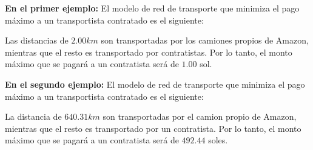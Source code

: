 \exampleCases

\begin{example}
\end{example}

\explanationText


\textbf{En el primer ejemplo:} El modelo de red de transporte que minimiza el pago máximo a un transportista contratado es el siguiente:

\begin{figure}[h]
    \centering
    
\end{figure}

Las distancias de $2.00 km$ son transportadas por los camiones propios de Amazon, mientras que el resto es transportado por contratistas. Por lo tanto, el monto máximo que se pagará a un contratista será de $1.00$ sol.

\textbf{En el segundo ejemplo:} El modelo de red de transporte que minimiza el pago máximo a un transportista contratado es el siguiente:

\begin{figure}[h]
    \centering
    
\end{figure}

La distancia de $640.31 km$ son transportadas por el camion propio de Amazon, mientras que el resto es transportado por un contratista. Por lo tanto, el monto máximo que se pagará a un contratista será de $492.44$ soles.
